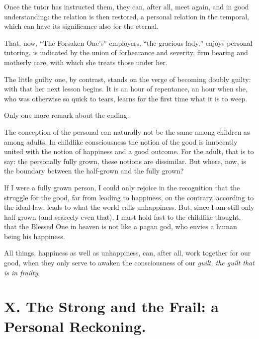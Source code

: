 \documentclass[12pt,a4paper]{book}
\begin{document}
Once the tutor has instructed them, they can, after all, meet again, and in good understanding: the relation is then restored, a personal relation in the temporal, which can have its significance also for the eternal.

That, now, ``The Forsaken One's'' employers, ``the gracious lady,'' enjoys personal tutoring, is indicated by the union of forbearance and severity, firm bearing and motherly care, with which she treats those under her.

The little guilty one, by contrast, stands on the verge of becoming doubly guilty: with that her next lesson begins. It is an hour of repentance, an hour when she, who was otherwise so quick to tears, learns for the first time what it is to weep.

Only one more remark about the ending.

The conception of the personal can naturally not be the same among children as among adults. In childlike
consciousness the notion of the good is innocently united with the notion of happiness and a good outcome. For the adult, that is to say: the personally fully grown, these notions are dissimilar. But where, now, is the boundary between the half-grown and the fully grown?

If I were a fully grown person, I could only rejoice in the recognition that the struggle for the good, far from leading to happiness, on the contrary, according to the ideal law, leads to what the world calls unhappiness. But, since I am still only half grown (and scarcely even that), I must hold fast to the childlike thought, that the Blessed One in heaven is not like a pagan god, who envies a human being his happiness.

All things, happiness as well as unhappiness, can, after all, work together for our good, when they only serve to awaken the consciousness of our \emph{guilt, the guilt that is in frailty}.

\chapter*{X. The Strong and the Frail: a Personal Reckoning.}
\label{ch:forel10}
\end{document}
